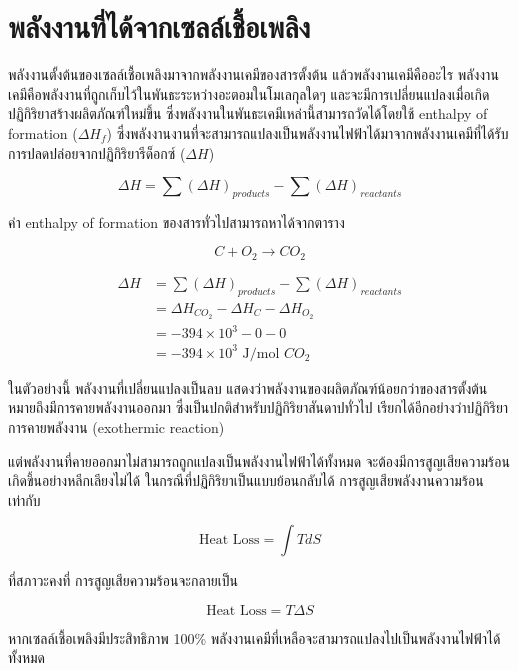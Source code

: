 \message{ !name(solar.tex)}\documentclass[
a4paper,
svgnames,
openany,
justified,
]{tufte-book}
\begin{document}
\section{พลังงานที่ได้จากเซลล์เชื้อเพลิง}

พลังงานตั้งต้นของเซลล์เชื้อเพลิงมาจากพลังงานเคมีของสารตั้งต้น แล้วพลังงานเคมีคืออะไร พลังงานเคมีคือพลังงานที่ถูกเก็บไว้ในพันธะระหว่างอะตอมในโมเลกุลใดๆ และจะมีการเปลี่ยนแปลงเมื่อเกิดปฏิกิริยาสร้างผลิตภัณฑ์ใหม่ขึ้น ซึ่งพลังงานในพันธะเคมีเหล่านี้สามารถวัดได้โดยใช้ enthalpy of formation ($\Delta H_f$) ซึ่งพลังงานงานที่จะสามารถแปลงเป็นพลังงานไฟฟ้าได้มาจากพลังงานเคมีที่ได้รับการปลดปล่อยจากปฏิกิริยารีด็อกซ์ ($\Delta H$)

$$ \Delta H = \sum (\Delta H)_{products} - \sum (\Delta H)_{reactants} $$

ค่า enthalpy of formation ของสารทั่วไปสามารถหาได้จากตาราง

\begin{equation*}
  C + O_2 \rightarrow CO_2
\end{equation*}

\begin{align*}
  \Delta H &= \sum (\Delta H)_{products} - \sum (\Delta H)_{reactants} \\
           &= \Delta H_{CO_2} - \Delta H_C - \Delta H_{O_2} \\
           &= -394 \times 10^3 - 0 - 0 \\
           &= -394 \times 10^3 \text{ J/mol } CO_2
\end{align*}

ในตัวอย่างนี้ พลังงานที่เปลี่ยนแปลงเป็นลบ แสดงว่าพลังงานของผลิตภัณฑ์น้อยกว่าของสารตั้งต้น หมายถึงมีการคายพลังงานออกมา ซึ่งเป็นปกติสำหรับปฏิกิริยาสันดาปทั่วไป เรียกได้อีกอย่างว่าปฏิกิริยาการคายพลังงาน (exothermic reaction)

แต่พลังงานที่คายออกมาไม่สามารถถูกแปลงเป็นพลังงานไฟฟ้าได้ทั้งหมด จะต้องมีการสูญเสียความร้อนเกิดขึ้นอย่างหลีกเลียงไม่ได้ ในกรณีที่ปฏิกิริยาเป็นแบบย้อนกลับได้ การสูญเสียพลังงานความร้อนเท่ากับ

\begin{equation}
  \text{Heat Loss} = \int T dS
\end{equation}

ที่สภาวะคงที่ การสูญเสียความร้อนจะกลายเป็น

\begin{equation}
  \text{Heat Loss} = T \Delta S
\end{equation}

หากเซลล์เชื้อเพลิงมีประสิทธิภาพ 100\% พลังงานเคมีที่เหลือจะสามารถแปลงไปเป็นพลังงานไฟฟ้าได้ทั้งหมด
\end{document}
